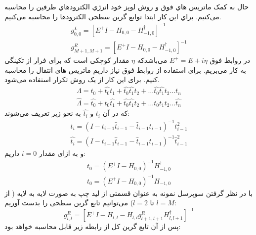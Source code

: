 حال به کمک ماتریس هاي فوق و روش لوپز خود انرژي الکترودهاي طرفین را محاسبه می‌کنیم. براي این کار ابتدا توابع گرین سطحی الکترودها را محاسبه می‌کنیم.
\begin{equation}
    \begin{split}
        g_{0,0}^L = \left[ E^{+}I - H_{0,0} -H^{\dagger}_{-1,0} \right]^{-1}\\
        g_{M+1,M+1}^R = \left[ E^{+}I - H_{0,0} -H^{\dagger}_{-1,0} \right]^{-1}
    \end{split}
\end{equation}
در روابط فوق $E^{+} = E + i\eta$  می‌باشدکه $\eta$ مقدار کوچکی است که برای فرار از تکینگی به کار می‌بریم. برای استفاده از روابط فوق نیاز داریم ماتریس های انتقال را محاسبه کنیم. برای این کار از یک روش تکرار استفاده می‌شود.
\begin{equation}
    \begin{split}
        \Lambda = t_0 + \hat{t_0} t_1 + \hat{t_0}\hat{t_1}t_2 + \dots \hat{t_0}\hat{t_1}\hat{t_2}\dots t_n\\
        \hat{\Lambda} = \hat{t_0} + t_0 \hat{t_1} + \hat{t_0}\hat{t_1}t_2 + \dots t_0 t_1 t_2\dots \hat{t_n}
    \end{split}
\end{equation}
که در آن $t_i$ و $\hat{t_i}$  به نحو زیر تعریف می‌شوند:
\begin{equation}
    \begin{split}
        t_i = \left(I-t_{i-1}\hat{t}_{i-1}-\hat{t}_{i-1}t_{i-1}\right)^{-1} t_{i-1}^2\\
        \hat{t_i} = \left(I-t_{i-1}\hat{t}_{i-1}-\hat{t}_{i-1}t_{i-1}\right)^{-1} \hat{t}_{i-1}^2
    \end{split}
\end{equation}
و به ازای مقدار $i = 0$ داریم:
\begin{equation}
    \begin{split}
        t_0 = \left(E^{+}I-H_{0,0}\right)^{-1} H^{\dagger}_{-1,0}\\
        t_0 = \left(E^{+}I-H_{0,0}\right)^{-1} H_{-1,0}
    \end{split}
\end{equation}
با در نظر گرفتن سوپرسل نمونه به عنوان قسمتی از لید چپ به صورت لایه به لایه ( از $l = M$ تا $l = 2$) می‌توانیم تابع گرین سطحی را بدست آوریم:
\begin{equation}
    g_{l,l}^R = \left[E^+ I- H_{l,l} - H_{l,l}g_{l+1,l+1}^RH^{\dagger}_{l,l+1} \right]^{-1}
\end{equation}
پس از آن تابع گرین کل از رابطه زیر قابل محاسبه خواهد بود:
